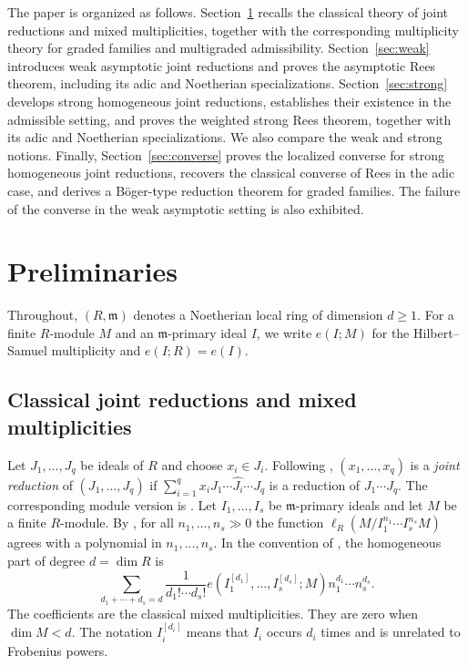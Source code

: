 \documentclass[reqno,12pt]{amsart}
\theoremstyle{plain}
\theoremstyle{definition}
\theoremstyle{remark}
\numberwithin{equation}{section}
\begin{document}
The paper is organized as follows.
Section~\ref{sec:preliminaries} recalls the classical theory of joint
reductions and mixed multiplicities, together with the corresponding
multiplicity theory for graded families and multigraded admissibility.
Section~\ref{sec:weak} introduces weak asymptotic joint reductions and
proves the asymptotic Rees theorem, including its adic and Noetherian
specializations.
Section~\ref{sec:strong} develops strong homogeneous joint reductions,
establishes their existence in the admissible setting, and proves the
weighted strong Rees theorem, together with its adic and Noetherian
specializations. We also compare the weak and strong notions.
Finally, Section~\ref{sec:converse} proves the localized converse for
strong homogeneous joint reductions, recovers the classical converse of
Rees in the adic case, and derives a B\"oger-type reduction theorem for
graded families. The failure of the converse in the weak asymptotic
setting is also exhibited.



\section{Preliminaries}
\label{sec:preliminaries}

Throughout, $(R,\mathfrak m)$ denotes a Noetherian local ring of dimension
$d\geq1$. For a finite $R$-module $M$ and an $\mathfrak m$-primary ideal
$I$, we write $e(I;M)$ for the Hilbert--Samuel multiplicity and
$e(I;R)=e(I)$.

\subsection*{Classical joint reductions and mixed multiplicities}

Let $J_1,\ldots,J_q$ be ideals of $R$ and choose $x_i\in J_i$. Following
\cite[Definition~17.1.1]{SwansonHuneke}, $(x_1,\ldots,x_q)$ is a
\emph{joint reduction} of $(J_1,\ldots,J_q)$ if
\(
\sum_{i=1}^{q}x_iJ_1\cdots\widehat{J_i}\cdots J_q
\)
is a reduction of $J_1\cdots J_q$. The corresponding module version is
\cite[Definition~17.1.3]{SwansonHuneke}. Let $I_1,\ldots,I_s$ be $\mathfrak m$-primary ideals and let $M$ be a
finite $R$-module. By \cite[Theorem~17.4.2]{SwansonHuneke}, for all
$n_1,\ldots,n_s\gg0$ the function
$\ell_R(M/I_1^{n_1}\cdots I_s^{n_s}M)$ agrees with a polynomial in
$n_1,\ldots,n_s$. In the convention of
\cite[Definition~17.4.3]{SwansonHuneke}, the homogeneous part of degree
$d=\dim R$ is
\[
\sum_{d_1+\cdots+d_s=d}
\frac{1}{d_1!\cdots d_s!}
 e(I_1^{[d_1]},\ldots,I_s^{[d_s]};M)
 n_1^{d_1}\cdots n_s^{d_s}.
\]
The coefficients are the classical mixed multiplicities. They are zero
when $\dim M<d$. The notation $I_i^{[d_i]}$ means that $I_i$ occurs
$d_i$ times and is unrelated to Frobenius powers.
\end{document}
